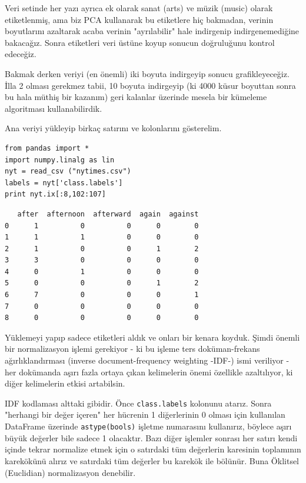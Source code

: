 \documentclass[12pt,fleqn]{article}\usepackage{../../common}
\begin{document}
Veri setinde her yazı ayrıca ek olarak sanat (arts) ve müzik (music)
olarak etiketlenmiş, ama biz PCA kullanarak bu etiketlere hiç
bakmadan, verinin boyutlarını azaltarak acaba verinin "ayrılabilir"
hale indirgenip indirgenemediğine bakacağız. Sonra etiketleri veri
üstüne koyup sonucun doğruluğunu kontrol edeceğiz.

Bakmak derken veriyi (en önemli) iki boyuta indirgeyip sonucu
grafikleyeceğiz. İlla 2 olması gerekmez tabii, 10 boyuta indirgeyip
(ki 4000 küsur boyuttan sonra bu hala müthiş bir kazanım) geri
kalanlar üzerinde mesela bir kümeleme algoritması kullanabilirdik.

Ana veriyi yükleyip birkaç satırını ve kolonlarını gösterelim.

\begin{verbatim}
from pandas import *
import numpy.linalg as lin
nyt = read_csv ("nytimes.csv")
labels = nyt['class.labels']
print nyt.ix[:8,102:107]
\end{verbatim}

\begin{verbatim}
   after  afternoon  afterward  again  against
0      1          0          0      0        0
1      1          1          0      0        0
2      1          0          0      1        2
3      3          0          0      0        0
4      0          1          0      0        0
5      0          0          0      1        2
6      7          0          0      0        1
7      0          0          0      0        0
8      0          0          0      0        0
\end{verbatim}

Yüklemeyi yapıp sadece etiketleri aldık ve onları bir kenara
koyduk. Şimdi önemli bir normalizasyon işlemi gerekiyor - ki bu işleme
ters doküman-frekans ağırlıklandırması (inverse document-frequency
weighting -IDF-) ismi veriliyor - her dokümanda aşırı fazla ortaya
çıkan kelimelerin önemi özellikle azaltılıyor, ki diğer kelimelerin
etkisi artabilsin.

IDF kodlaması alttaki gibidir. Önce \verb!class.labels! kolonunu
atarız. Sonra "herhangi bir değer içeren" her hücrenin 1 diğerlerinin
0 olması için kullanılan DataFrame üzerinde \verb!astype(bools)! işletme
numarasını kullanırız, böylece aşırı büyük değerler bile sadece 1
olacaktır. Bazı diğer işlemler sonrası her satırı kendi içinde tekrar
normalize etmek için o satırdaki tüm değerlerin karesinin toplamının
karekökünü alırız ve satırdaki tüm değerler bu karekök ile
bölünür. Buna Öklitsel (Euclidian) normalizasyon denebilir.
\end{document}
